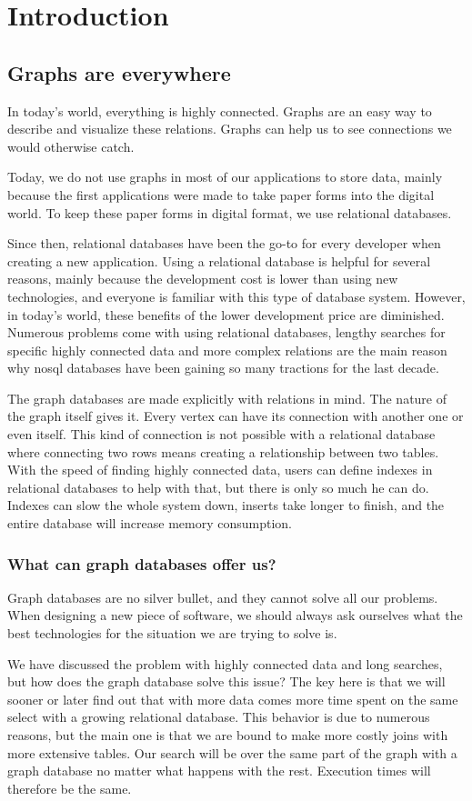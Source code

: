 \chapter{Introduction}

\section{Graphs are everywhere}

In today's world, everything is highly connected. Graphs are an easy way to describe and visualize these relations. Graphs can help us to see connections we would otherwise catch.

Today, we do not use graphs in most of our applications to store data, mainly because the first applications were made to take paper forms into the digital world. To keep these paper forms in digital format, we use relational databases.

Since then, relational databases have been the go-to for every developer when creating a new application. Using a relational database is helpful for several reasons, mainly because the development cost is lower than using new technologies, and everyone is familiar with this type of database system. However, in today's world, these benefits of the lower development price are diminished. Numerous problems come with using relational databases,
lengthy searches for specific highly connected data and more complex relations are the main reason why \Gls{nosql} databases have been gaining so many tractions for the last decade.

The graph databases are made explicitly with relations in mind. The nature of the graph itself gives it. Every vertex can have its connection with another one or even itself. This kind of connection is not possible with a relational database where connecting two rows means creating a relationship between two tables. With the speed of finding highly connected data, users can define indexes in relational databases to help with that, but there is only so much he can do. Indexes can slow the whole system down, inserts take longer to finish, and the entire database will increase memory consumption.

\subsection{What can graph databases offer us?}

Graph databases are no silver bullet, and they cannot solve all our problems. When designing a new piece of software, we should always ask ourselves what the best technologies for the situation we are trying to solve is.

We have discussed the problem with highly connected data and long searches, but how does the graph database solve this issue? The key here is that we will sooner or later find out that with more data comes more time spent on the same select with a growing relational database. This behavior is due to numerous reasons, but the main one is that we are bound to make more costly joins with more extensive tables. Our search will be over the same part of the graph with a graph database no matter what happens with the rest. Execution times will therefore be the same.
